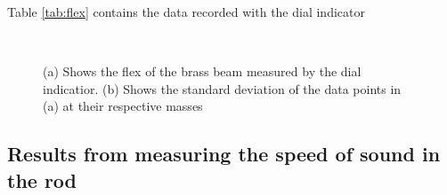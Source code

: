 \documentclass[%
 reprint,
 amsmath,amssymb,
 aps,
]{revtex4-1}
\begin{document}
  Table \ref{tab:flex} contains the data recorded with the dial indicator
   
    \begin{figure}[h!]
      \centering
       \\
      \center
      \caption{(a) Shows the flex of the brass beam measured by the dial indicatior. (b) Shows the standard deviation of the data points in (a) at their respective masses}
      \label{fig:exp_1}
    \end{figure}

  \subsection{Results from measuring the speed of sound in the rod}
\end{document}
